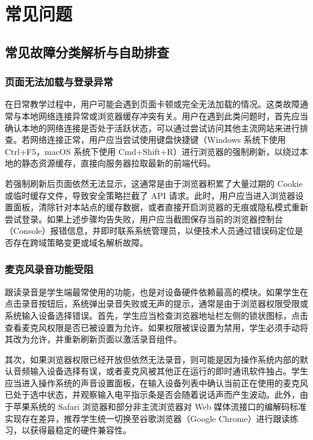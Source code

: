 \chapter{常见问题}

\section{常见故障分类解析与自助排查}

\subsection{页面无法加载与登录异常}

在日常教学过程中，用户可能会遇到页面卡顿或完全无法加载的情况。这类故障通常与本地网络连接异常或浏览器缓存冲突有关。用户在遇到此类问题时，首先应当确认本地的网络连接是否处于活跃状态，可以通过尝试访问其他主流网站来进行排查。若网络连接正常，用户应当尝试使用键盘快捷键（Windows 系统下使用 Ctrl+F5，macOS 系统下使用 Cmd+Shift+R）进行浏览器的强制刷新，以绕过本地的静态资源缓存，直接向服务器拉取最新的前端代码。

若强制刷新后页面依然无法显示，这通常是由于浏览器积累了大量过期的 Cookie 或临时缓存文件，导致安全策略拦截了 API 请求。此时，用户应当进入浏览器设置面板，清除针对本站点的缓存数据，或者直接开启浏览器的无痕或隐私模式重新尝试登录。如果上述步骤均告失败，用户应当截图保存当前的浏览器控制台（Console）报错信息，并即时联系系统管理员，以便技术人员通过错误码定位是否存在跨域策略变更或域名解析故障。

\subsection{麦克风录音功能受阻}

跟读录音是学生端最常使用的功能，也是对设备硬件依赖最高的模块。如果学生在点击录音按钮后，系统弹出录音失败或无声的提示，通常是由于浏览器权限受限或系统输入设备选择错误。首先，学生应当检查浏览器地址栏左侧的锁状图标，点击查看麦克风权限是否已被设置为允许。如果权限被误设置为禁用，学生必须手动将其改为允许，并重新刷新页面以激活录音组件。

其次，如果浏览器权限已经开放但依然无法录音，则可能是因为操作系统内部的默认音频输入设备选择有误，或者麦克风被其他正在运行的即时通讯软件独占。学生应当进入操作系统的声音设置面板，在输入设备列表中确认当前正在使用的麦克风已处于选中状态，并观察输入电平指示条是否会随着说话声而产生波动。此外，由于苹果系统的 Safari 浏览器和部分非主流浏览器对 Web 媒体流接口的编解码标准实现存在差异，推荐学生统一切换至谷歌浏览器（Google Chrome）进行跟读练习，以获得最稳定的硬件兼容性。

